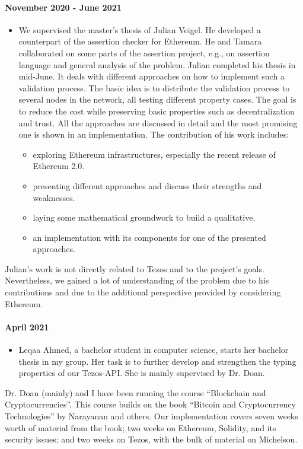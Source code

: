 \documentclass[a4paper,11pt]{article}
\begin{document}
\paragraph{November 2020 - June 2021}
\begin{itemize}
\item We supervised the master's thesis of Julian Veigel. He developed a counterpart of the assertion checker for Ethereum. He  and Tamara collaborated on some parts of the assertion project, e.g., on assertion language and general analysis of the problem. Julian completed his thesis in mid-June. It deals with different approaches on how to implement such a validation process. The basic idea is to distribute the validation process to several nodes in the network, all testing different property cases. The goal is to reduce the cost while preserving basic properties such as decentralization and trust. All the approaches are discussed in detail and the most promising one is shown in an implementation. The contribution of his work includes:
\begin{itemize}
\item exploring Ethereum infrastructures, especially the recent release of Ethereum 2.0.
\item presenting different approaches and discuss their strengths and weaknesses.
\item laying some mathematical groundwork to build a qualitative.
\item an implementation with its components for one of the presented approaches.
\end{itemize}
\end{itemize}

Julian's work is not directly related to Tezos and to the project's goals. Nevertheless, we gained a lot of understanding of the problem due to his contributions and due to the additional perspective provided by considering Ethereum. 


\paragraph{April 2021}
\begin{itemize}
\item Leqaa Ahmed, a bachelor student in computer science, starts her bachelor thesis in my group. Her task is to further develop and strengthen the typing properties of our Tezos-API. She is mainly supervised by Dr. Doan.
\end{itemize}

Dr. Doan (mainly) and I have been running the course “Blockchain and Cryptocurrencies”. This course builds on the book “Bitcoin and Cryptocurrency Technologies” by Narayanan and others. Our implementation covers seven weeks worth of material from the book; two weeks on Ethereum, Solidity, and its security issues; and two weeks on Tezos, with the bulk of material on Michelson. 
\end{document}
